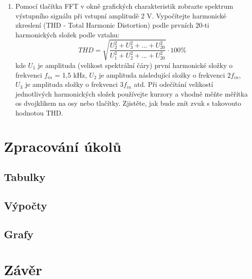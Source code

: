 \documentclass[a4paper, czech]{article}
\begin{document}
\begin{enumerate}
    \item Pomocí tlačítka FFT v okně grafických charakteristik zobrazte spektrum výstupního signálu při vstupní amplitudě 2 V. Vypočítejte harmonické zkreslení (THD - Total Harmonic Distortion) podle prvních 20-ti harmonických složek podle vztahu:
    \begin{equation*}
        THD = \sqrt{\frac{U_2^2 + U_3^2 + ... + U_{20}^2}{U_1^2 + U_2^2 + ... + U_{20}^2}} \cdot 100 \%
    \end{equation*}
    kde $U_1$ je amplituda (velikost spektrální čáry) první harmonické složky o frekvenci $f_{in}$ = 1,5 kHz, $U_2$ je amplituda následující složky o frekvenci $2 f_{in}$, $U_3$ je amplituda složky o frekvenci $3f_{in}$ atd. Při odečítání velikostí jednotlivých harmonických složek používejte kurzory a vhodně měňte měřítka os dvojklikem na osy nebo tlačítky. Zjistěte, jak bude znít zvuk s takovouto hodnotou THD.
\end{enumerate}

\section{Zpracování úkolů}

\subsection{Tabulky}

\subsection{Výpočty}

\subsection{Grafy}

\section{Závěr}
\end{document}
